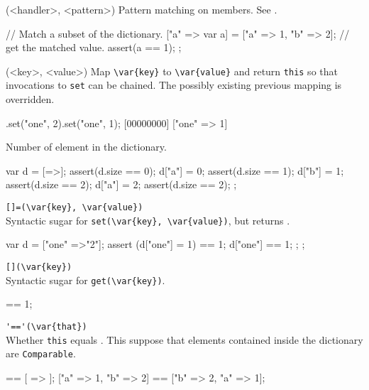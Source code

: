 \begin{urbiscriptapi}
\item[matchAgainst](<handler>, <pattern>)
  Pattern matching on members.  See .

\begin{urbiscript}
{
  // Match a subset of the dictionary.
  ["a" => var a] = ["a" => 1, "b" => 2];
  // get the matched value.
  assert(a == 1);
};
\end{urbiscript}

\item[set](<key>, <value>)
  Map \lstinline|\var{key}| to \lstinline|\var{value}| and return
  \lstinline|this| so that invocations to \lstinline|set| can be
  chained.  The possibly existing previous mapping is overridden.

\begin{urbiscript}
[=>].set("one", 2).set("one", 1);
[00000000] ["one" => 1]
\end{urbiscript}

\item[size]
  Number of element in the dictionary.

\begin{urbiscript}
{
  var d = [=>];
  assert(d.size == 0);
  d["a"] = 0;
  assert(d.size == 1);
  d["b"] = 1;
  assert(d.size == 2);
  d["a"] = 2;
  assert(d.size == 2);
};
\end{urbiscript}

\item \lstinline|[]=(\var{key}, \var{value})|\\
  Syntactic sugar for \lstinline|set(\var{key}, \var{value})|, but
  returns .

\begin{urbiscript}
{
  var d = ["one" =>"2"];
  assert
  {
    (d["one"] = 1) == 1;
    d["one"] == 1;
  };
};
\end{urbiscript}

\item \lstinline|[](\var{key})|\\
  Syntactic sugar for \lstinline|get(\var{key})|.

\begin{urbiassert}
["one" => 1]["one"] == 1;
\end{urbiassert}

\item \lstinline|'=='(\var{that})|\\
  Whether \lstinline|this| equals .  This suppose that elements
  contained inside the dictionary are \lstinline|Comparable|.
\begin{urbiassert}
[ => ] == [ => ];
["a" => 1, "b" => 2] == ["b" => 2, "a" => 1];
\end{urbiassert}

\end{urbiscriptapi}


